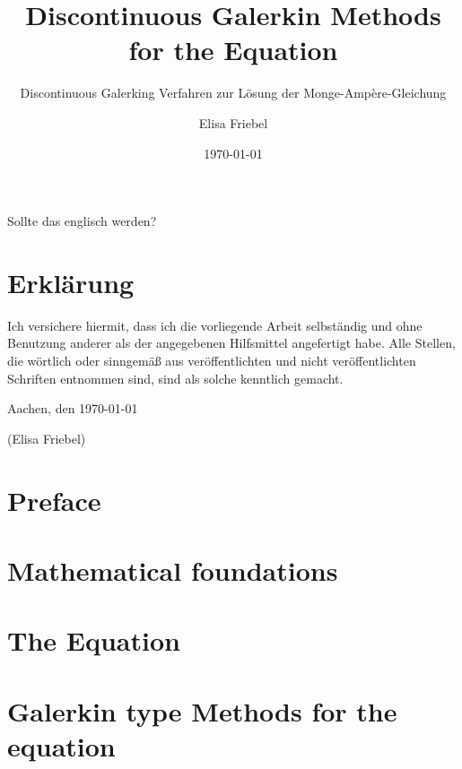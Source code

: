 \documentclass{template}
\title{Discontinuous Galerkin Methods for the \MA Equation}
\subtitle{\Large Discontinuous Galerking Verfahren zur Lösung der Monge-Amp\`ere-Gleichung}
\author{Elisa Friebel} %
\date{\today}
\begin{document}
\maketitle

\begin{center}
\begin{minipage}[t]{0.8\textwidth}

Sollte das englisch werden?
\chapter*{Erklärung}
Ich versichere hiermit, dass ich die vorliegende Arbeit selbständig und
ohne Benutzung anderer als der angegebenen Hilfsmittel angefertigt habe.
Alle Stellen, die wörtlich oder sinngemäß aus veröffentlichten und nicht
veröffentlichten Schriften entnommen sind, sind als solche kenntlich
gemacht.

\vspace{1cm}
Aachen, den \today

\vspace{2cm}
(Elisa Friebel)
\end{minipage}
\end{center}
\thispagestyle{empty}
\cleardoublepage

\tableofcontents{}

\setcounter{page}{1}


\chapter{Preface}
\label{ch:preface}

\chapter{Mathematical foundations}
\label{ch:TheoreticalBackground}



\chapter{The \MA Equation}
\label{ch:MongeAmpereEq}



\chapter{Galerkin type Methods for the \MA equation}
\label{ch:DGMongeAmpere}

\end{document}
